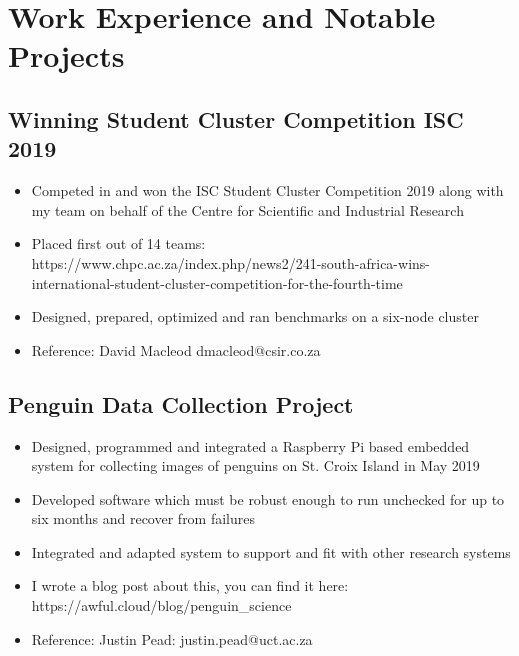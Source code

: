 \documentclass[12pt,a4paper,notitlepage]{article}
\begin{document}
\section*{Work Experience and Notable Projects}

\subsection*{Winning Student Cluster Competition ISC 2019}
\begin{itemize}
	\setlength\itemsep{0.02em}
    \item Competed in and won the ISC Student Cluster Competition 2019 along with my team on behalf of the Centre for Scientific and Industrial Research
    \item Placed first out of 14 teams:\\https://www.chpc.ac.za/index.php/news2/241-south-africa-wins-international-student-cluster-competition-for-the-fourth-time
    \item Designed, prepared, optimized and ran benchmarks on a six-node cluster
    \item Reference: David Macleod dmacleod@csir.co.za
\end{itemize}

\subsection*{Penguin Data Collection Project}
\begin{itemize}
	\setlength\itemsep{0.02em}
    \item Designed, programmed and integrated a Raspberry Pi based embedded system for collecting images of penguins on St. Croix Island in May 2019
    \item Developed software which must be robust enough to run unchecked for up to six months and recover from failures
    \item Integrated and adapted system to support and fit with other research systems
    \item I wrote a blog post about this, you can find it here:\\https://awful.cloud/blog/penguin\_science
    \item Reference: Justin Pead: justin.pead@uct.ac.za
\end{itemize}
\end{document}
